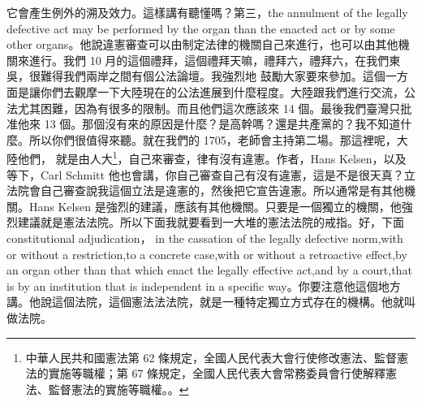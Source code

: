 \hypertarget{w05:cue:151}{}它會產生例外的溯及效力。這樣講有聽懂嗎？第三，the annulment of the legally defective act may be performed by the organ than the enacted act or by some other organs。他說違憲審查可以由制定法律的機關自己來進行，也可以由其他機關來進行。我們 10 月的這個禮拜，這個禮拜天嘛，禮拜六，禮拜六，在我們東吳，很難得我們兩岸之間有個公法論壇。我強烈地
\hypertarget{w05:cue:152}{}鼓勵大家要來參加。這個一方面是讓你們去觀摩一下大陸現在的公法進展到什麼程度。大陸跟我們進行交流，公法尤其困難，因為有很多的限制。而且他們這次應該來 14 個。最後我們臺灣只批准他來 13 個。那個沒有來的原因是什麼？是高幹嗎？還是共產黨的？我不知道什麼。所以你們很值得來聽。就在我們的 1705，老師會主持第二場。那這裡呢，大陸他們，
\hypertarget{w05:cue:153}{}就是由人大\footnote{中華人民共和國憲法第 62 條規定，全國人民代表大會行使修改憲法、監督憲法的實施等職權；第 67 條規定，全國人民代表大會常務委員會行使解釋憲法、監督憲法的實施等職權。\cite{prcconst2018}。}，自己來審查，律有沒有違憲。作者，Hans Kelsen，以及等下，Carl Schmitt 他也會講，你自己審查自己有沒有違憲，這是不是很天真？立法院會自己審查說我這個立法是違憲的，然後把它宣告違憲。所以通常是有其他機關。Hans Kelsen 是強烈的建議，應該有其他機關。只要是一個獨立的機關，他強烈建議就是憲法法院。所以下面我就要看到一大堆的憲法法院的戒指。好，下面 constitutional adjudication，
\hypertarget{w05:cue:154}{}in the cassation of the legally defective norm,with or without a restriction,to a concrete case,with or without a retroactive effect,by an organ other than that which enact the legally effective act,and by a court,that is by an institution that is independent in a specific way。你要注意他這個地方講。他說這個法院，這個憲法法法院，就是一種特定獨立方式存在的機構。他就叫做法院。

